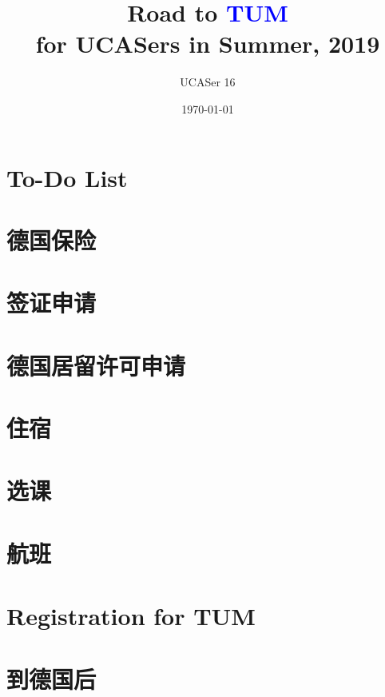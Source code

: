 \documentclass[oneside,final]{book}
\title{\huge{Road to \textbf{\textcolor{blue}{TUM}}}\\for UCASers in Summer, 2019}
\author{UCASer 16}
\date{\today}
\begin{document}
\maketitle

\setcounter{chapter}{-1}


\newpage

\chapter{To-Do List}


\tableofcontents

\chapter{德国保险}


\chapter{签证申请}


\chapter{德国居留许可申请}


\chapter{住宿}


\chapter{选课}


\chapter{航班}


\chapter{Registration for TUM}


\chapter{到德国后}\label{chap:in-Germany}

\end{document}
